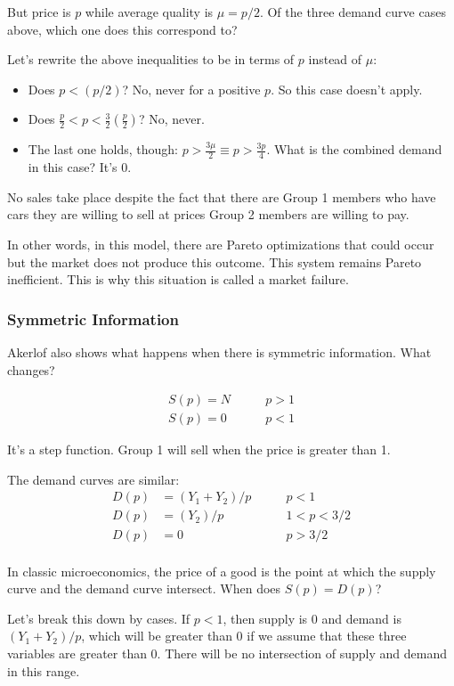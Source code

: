 \documentclass[11pt]{article}
\begin{document}
But price is $p$ while average quality is $\mu = p/2$. Of the three demand curve cases above, which one does this correspond to? 

Let's rewrite the above inequalities to be in terms of $p$ instead of $\mu$:
\begin{itemize}
    \item Does $p < (p/2)$? No, never for a positive $p$. So this case doesn't apply.
    \item Does $\frac{p}{2} < p < \frac{3}{2}(\frac{p}{2})$? No, never.
    \item The last one holds, though: $p > \frac{3 \mu}{2} \equiv p > \frac{3p}{4}$. What is the combined demand in this case? It's 0.
\end{itemize}

No sales take place despite the fact that there are Group 1 members who have cars they are willing to sell at prices Group 2 members are willing to pay.

In other words, in this model, there are Pareto optimizations that could occur but the market does not produce this outcome. This system remains Pareto inefficient. This is why this situation is called a market failure.

\subsubsection{Symmetric Information}

Akerlof also shows what happens when there is symmetric information. What changes? 

\begin{align*}
    S(p) = N & \qquad p > 1\\
    S(p) = 0 & \qquad p < 1
\end{align*}

It's a step function. Group 1 will sell when the price is greater than 1.

The demand curves are similar:
\begin{align*}
D(p) &= (Y_1 + Y_2)/p & \qquad p < 1\\
D(p) &= (Y_2)/p & \qquad 1 < p < 3/2\\
D(p) &= 0 & \qquad p > 3/2\\
\end{align*}

In classic microeconomics, the price of a good is the point at which the supply curve and the demand curve intersect. When does $S(p)=D(p)$?

Let's break this down by cases. If $p < 1$, then supply is 0 and demand is $(Y_1 + Y_2)/p$, which will be greater than 0 if we assume that these three variables are greater than 0. There will be no intersection of supply and demand in this range.
\end{document}
